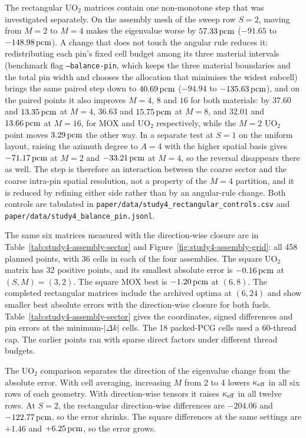 The rectangular UO$_2$ matrices contain one non-monotone step that was
investigated separately. On the assembly mesh of the sweep row $S{=}2$, moving
from $M{=}2$ to $M{=}4$ makes the eigenvalue worse by $57.33\,\mathrm{pcm}$
($-91.65$ to $-148.98\,\mathrm{pcm}$). A change that does not touch the angular rule
reduces it: redistributing each pin's fixed cell budget among its three
material intervals (benchmark flag \texttt{--balance-pin}, which keeps the
three material boundaries and the total pin width and chooses the allocation
that minimises the widest subcell) brings the same paired step down to
$40.69\,\mathrm{pcm}$ ($-94.94$ to $-135.63\,\mathrm{pcm}$), and on the paired points it also
improves $M{=}4$, $8$ and $16$ for both materials: by $37.60$ and
$13.35\,\mathrm{pcm}$ at $M{=}4$, $36.63$ and $15.75\,\mathrm{pcm}$ at $M{=}8$, and $32.01$ and
$13.66\,\mathrm{pcm}$ at $M{=}16$, for MOX and UO$_2$ respectively, while the $M{=}2$
UO$_2$ point moves $3.29\,\mathrm{pcm}$ the other way. In a separate test at $S{=}1$ on the
uniform layout, raising the azimuth degree to $A{=}4$ with the higher spatial basis
gives $-71.17\,\mathrm{pcm}$ at $M{=}2$ and $-33.21\,\mathrm{pcm}$ at $M{=}4$, so the reversal
disappears there as well. The step is therefore an interaction between the
coarse sector and the coarse intra-pin spatial resolution, not a property of
the $M{=}4$ partition, and it is reduced by refining either side rather than
by an angular-rule change. Both controls are tabulated in
\texttt{paper/data/study4\_rectangular\_controls.csv} and
\texttt{paper/data/study4\_\allowbreak balance\_\allowbreak pin.jsonl}.

The same six matrices measured with the direction-wise closure are in
Table~\ref{tab:study4-assembly-sector} and Figure~\ref{fig:study4-assembly-grid}:
all 458 planned points, with 36 cells in each of the four assemblies. The square
UO$_2$ matrix has 32 positive points, and its smallest absolute error is
$-0.16\,\mathrm{pcm}$ at $(S,M)=(3,2)$. The square MOX best is $-1.20\,\mathrm{pcm}$ at $(6,8)$.
The completed rectangular matrices include the archived optima at $(6,24)$ and
show smaller best absolute errors with the direction-wise closure for both fuels.
Table~\ref{tab:study4-assembly-sector} gives the coordinates, signed differences and
pin errors at the minimum-$|\Delta k|$ cells. The 18 packed-PCG cells used a 60-thread cap.
The earlier points ran with sparse direct factors under different thread budgets.

The UO$_2$ comparison separates the direction of the eigenvalue change from the
absolute error. With cell averaging, increasing $M$ from 2 to 4 lowers $\kappa_{\mathrm{eff}}$ in
all six rows of each geometry. With direction-wise tensors it raises $\kappa_{\mathrm{eff}}$ in all
twelve rows. At $S{=}2$, the rectangular direction-wise differences are
$-204.06$ and $-122.77\,\mathrm{pcm}$, so the error shrinks. The square differences at the
same settings are $+1.46$ and $+6.25\,\mathrm{pcm}$, so the error grows.

